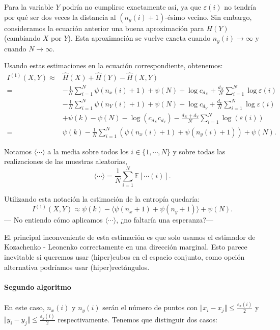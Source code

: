 \documentclass[10pt,a4paper]{article} %
\theoremstyle{definition}
\begin{document}
Para la variable $Y$ podría no cumplirse exactamente así, ya que $\varepsilon(i)$ no tendría por qué ser dos veces la distancia al $(n_y(i)+1)$-ésimo vecino. Sin embargo, consideramos la ecuación anterior una buena aproximación para $H(Y)$ (cambiando $X$ por $Y$). Esta aproximación se vuelve exacta cuando $n_y(i) \to \infty$ y cuando $N\to \infty$.

Usando estas estimaciones en la ecuación correspondiente, obtenemos:
\begin{align*}
  I^{(1)}(X,Y) \approx & \widehat{H}(X) + \widehat{H}(Y) - \widehat{H}(X, Y)\\ =& - \frac{1}{N}\sum_{i=1}^N\psi(n_x(i)+1) + \psi(N) + \log c_{d_X} + \frac{d_X}{N} \sum_{i=1}^N\log \varepsilon(i)\\
  & - \frac{1}{N}\sum_{i=1}^N\psi(n_Y(i)+1) + \psi(N) + \log c_{d_Y} + \frac{d_Y}{N} \sum_{i=1}^N\log \varepsilon(i)\\
  & + \psi(k) - \psi(N) - \log (c_{d_X}c_{d_Y}) - \frac{d_X+d_Y}{N} \sum_{i=1}^N\log(\varepsilon(i))\\
  =& \psi(k) - \frac{1}{N}\sum_{i=1}^N\left( \psi(n_x(i)+1) + \psi(n_y(i)+1) \right ) + \psi(N).
\end{align*}

Notamos $\langle \cdots \rangle$ a la media sobre todos los $i\in\{1,\cdots,N\}$ y sobre todas las realizaciones de las muestras aleatorias,\[
\langle \cdots \rangle = \frac{1}{N} \sum_{i=1}^N\mathbb{E}[\cdots(i)].
\]

Utilizando esta notación la estimación de la entropía quedaría:\[
I^{(1)}(X,Y) \approx \psi(k) - \langle \psi(n_x+1) + \psi(n_y+1) \rangle + \psi(N).
\]
--- No entiendo cómo aplicamos $\langle \cdots \rangle$, ¿no faltaría una esperanza?---

El principal inconveniente de esta estimación es que solo usamos el estimador de Kozachenko - Leonenko correctamente en una dirección marginal. Esto parece inevitable si queremos usar (hiper)cubos en el espacio conjunto, como opción alternativa podríamos usar (hiper)rectángulos.

\paragraph{Segundo algoritmo} En este caso, $n_x(i)$ y $n_y(i)$ serán el número de puntos con $\Vert x_i - x_j \Vert \leq \frac{\varepsilon_x(i)}{2}$ y $\Vert y_i - y_j \Vert \leq \frac{\varepsilon_y(i)}{2}$ respectivamente. Tenemos que distinguir dos casos:
\end{document}
